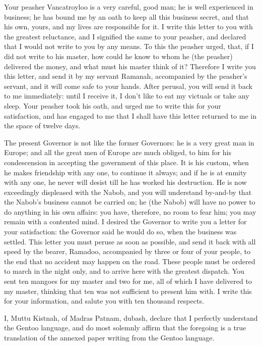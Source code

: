 Your peasher Vancatroyloo is a very careful, good man; he is well experienced in business; he has bound me by an oath to keep all this business secret, and that his own, yours, and my lives are responsible for it. I write this letter to you with the greatest reluctance, and I signified the same to your peasher, and declared that I would not write to you by any means. To this the peasher urged, that, if I did not write to his master, how could he know to whom he (the peasher) delivered the money, and what must his master think of it? Therefore I write you this letter, and send it by my servant Ramanah, accompanied by the peasher's servant, and it will come safe to your hands. After perusal, you will send it back to me immediately: until I receive it, I don't like to eat my victuals or take any sleep. Your peasher took his oath, and urged me to write this for your satisfaction, and has engaged to me that I shall have this letter returned to me in the space of twelve days.

The present Governor is not like the former Governors: he is a very great man in Europe; and all the great men of Europe are much obliged, to him for his condescension in accepting the government of this place. It is his custom, when he makes friendship with any one, to continue it always; and if he is at enmity with any one, he never will desist till he has worked his destruction. He is now exceedingly displeased with the Nabob, and you will understand by-and-by that the Nabob's business cannot be carried on; he (the Nabob) will have no power to do anything in his own affairs: you have, therefore, no room to fear him; you may remain with a contented mind. I desired the Governor to write you a letter for your satisfaction: the Governor said he would do so, when the business was settled. This letter you must peruse as soon as possible, and send it back with all speed by the bearer, Ramadoo, accompanied by three or four of your people, to the end that no accident may happen on the road. These people must be ordered to march in the night only, and to arrive here with the greatest dispatch. You sent ten mangoes for my master and two for me, all of which I have delivered to my master, thinking that ten was not sufficient to present him with. I write this for your information, and salute you with ten thousand respects.

\vspace{0.3cm}
I, Muttu Kistnah, of Madras Patnam, dubash, declare that I perfectly understand the Gentoo language, and do most solemnly affirm that the foregoing is a true translation of the annexed paper writing from the Gentoo language.

